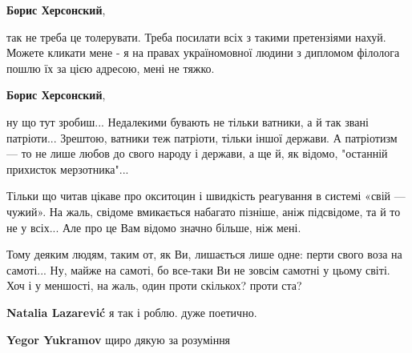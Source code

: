 \begin{itemize}
\begin{itemize}
 
\textbf{Борис Херсонский}, 

так не треба це толерувати. Треба посилати всіх з такими претензіями нахуй.
Можете кликати мене - я на правах україномовної людини з дипломом філолога
пошлю їх за цією адресою, мені не тяжко.


 
\textbf{Борис Херсонский}, 

ну що тут зробиш... Недалекими бувають не тільки ватники, а й так звані
патріоти... Зрештою, ватники теж патріоти, тільки іншої держави. \Smiley[1.0][yellow] А
патріотизм — то не лише любов до свого народу і держави, а ще й, як відомо,
"останній прихисток мерзотника"...

Тільки що читав цікаве про окситоцин і швидкість реагування в системі «свій —
чужий». На жаль, свідоме вмикається набагато пізніше, аніж підсвідоме, та й то
не у всіх... Але про це Вам відомо значно більше, ніж мені. \Smiley[1.0][yellow]

Тому деяким людям, таким от, як Ви, лишається лише одне: перти свого воза на
самоті... Ну, майже на самоті, бо все-таки Ви не зовсім самотні у цьому світі.
Хоч і у меншості, на жаль, один проти скількох? проти ста?

 
\textbf{Natalia Lazarević} я так і роблю. дуже поетично.

 
\textbf{Yegor Yukramov} щиро дякую за розуміння

\end{itemize}


\end{itemize}
